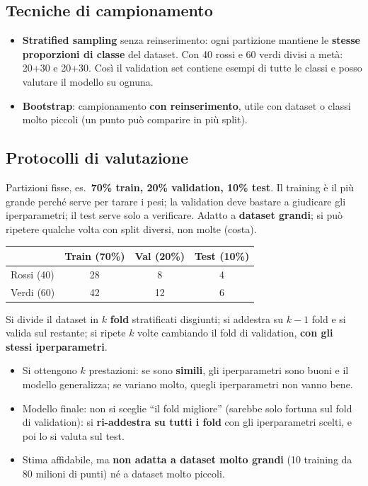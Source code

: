 \subsection{Tecniche di campionamento}
\begin{itemize}
  \item \textbf{Stratified sampling} senza reinserimento: ogni partizione mantiene le \textbf{stesse proporzioni di classe}
        del dataset. Con 40 rossi e 60 verdi divisi a metà: 20+30 e 20+30. Così il validation set contiene esempi di tutte le
        classi e posso valutare il modello su ognuna.
  \item \textbf{Bootstrap}: campionamento \textbf{con reinserimento}, utile con dataset o classi molto piccoli (un punto può
        comparire in più split).
\end{itemize}

\subsection{Protocolli di valutazione}
\begin{definizione}
Partizioni fisse, es.\ \textbf{70\% train, 20\% validation, 10\% test}. Il training è il più grande perché serve per tarare i
pesi; la validation deve bastare a giudicare gli iperparametri; il test serve solo a verificare. Adatto a \textbf{dataset grandi};
si può ripetere qualche volta con split diversi, non molte (costa).
\end{definizione}
\begin{center}
\small
\begin{tabular}{lccc}
\toprule
& \textbf{Train (70\%)} & \textbf{Val (20\%)} & \textbf{Test (10\%)}\\
\midrule
Rossi (40) & 28 & 8 & 4\\
Verdi (60) & 42 & 12 & 6\\
\bottomrule
\end{tabular}
\end{center}

\begin{definizione}
Si divide il dataset in $k$ \textbf{fold} stratificati disgiunti; si addestra su $k-1$ fold e si valida sul restante;
si ripete $k$ volte cambiando il fold di validation, \textbf{con gli stessi iperparametri}.
\end{definizione}
\begin{itemize}
  \item Si ottengono $k$ prestazioni: se sono \textbf{simili}, gli iperparametri sono buoni e il modello generalizza; se variano
        molto, quegli iperparametri non vanno bene.
  \item Modello finale: non si sceglie ``il fold migliore'' (sarebbe solo fortuna sul fold di validation): si
        \textbf{ri-addestra su tutti i fold} con gli iperparametri scelti, e poi lo si valuta sul test.
  \item Stima affidabile, ma \textbf{non adatta a dataset molto grandi} (10 training da 80 milioni di punti) né a dataset
        molto piccoli.
\end{itemize}

